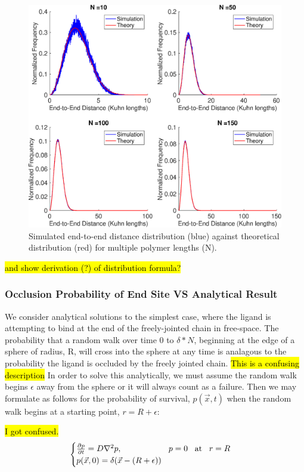 \documentclass[../AdvancementSummary.tex]{subfiles}
\begin{document}
\begin{figure}[H]
\begin{center}
\includegraphics[width=0.8\linewidth]{ModelConfirmationFigures/ReeDistribution.eps}
\caption{Simulated end-to-end distance distribution (blue) against theoretical distribution (red) for multiple polymer lengths (N). \label{fig: ReeDist}}
\end{center}
\end{figure}

\hl{and show derivation (?) of distribution formula?}

\subsubsection{Occlusion Probability of End Site VS Analytical Result}

We consider analytical solutions to the simplest case, where the ligand is attempting to bind at the end of the freely-jointed chain in free-space. The probability that a random walk over time 0 to $\delta*N$, beginning at the edge of a sphere of radius, R, will cross into the sphere at any time is analagous to the probability the ligand is occluded by the freely jointed chain. \hl{This is a confusing description} In order to solve this analytically, we must assume the random walk begins $\epsilon$ away from the sphere or it will always count as a failure. Then we may formulate as follows for the probability of survival, $p(\vec{x},t)$ when the random walk begins at a starting point, $r=R+\epsilon$:


\hl{I got confused.}
\begin{equation}\label{eq: diffusion}
	\begin{cases}
		\frac{\partial p}{\partial t} = D \nabla^2 p, \hspace{2cm} p=0 \hspace{3mm}\text{at}\hspace{3mm} r=R\\
		p(\vec{x},0) = \delta(\vec{x}-(R+\epsilon))\\
	\end{cases}
\end{equation}
\end{document}
